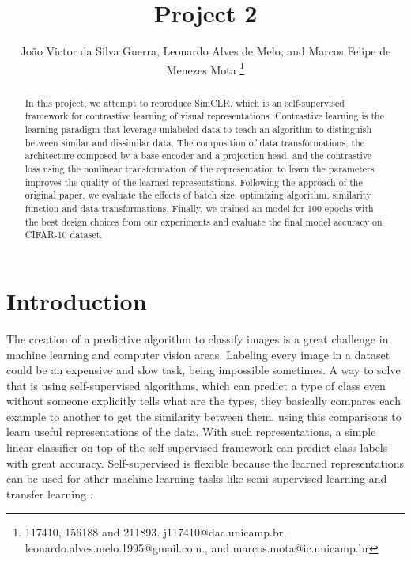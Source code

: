 \documentclass{article}
\begin{document}
\title{Project 2}
\author{
Jo\~ao Victor da Silva Guerra,
Leonardo Alves de Melo,
and Marcos Felipe de Menezes Mota
\thanks{117410, 156188 and 211893. j117410@dac.unicamp.br, leonardo.alves.melo.1995@gmail.com., and marcos.mota@ic.unicamp.br}
}

\maketitle

\begin{abstract}

  In this project, we attempt to reproduce SimCLR, which is an self-supervised framework for contrastive learning of visual representations. Contrastive learning is the learning paradigm that leverage unlabeled data to teach an algorithm to distinguish between similar and dissimilar data. The composition of data transformations, the architecture composed by a base encoder and a projection head, and the contrastive loss using the nonlinear transformation of the representation to learn the parameters improves the quality of the learned representations. Following the approach of the original paper, we evaluate the effects of batch size, optimizing algorithm, similarity function and data transformations. Finally, we trained an model for 100 epochs with the best design choices from our experiments and evaluate the final model accuracy on CIFAR-10 dataset.

\end{abstract}

\section{Introduction}

The creation of a predictive algorithm to classify images is a great challenge in machine learning and computer vision areas. Labeling every image in a dataset could be an expensive and slow task, being impossible sometimes. A way to solve that is using self-supervised algorithms, which can predict a type of class even without someone explicitly tells what are the types, they basically compares each example to another to get the similarity between them, using this comparisons to learn useful representations of the data. With such representations, a simple linear classifier on top of the self-supervised framework can predict class labels with great accuracy. Self-supervised is flexible because the learned representations can be used for other machine learning tasks like semi-supervised learning and transfer learning \cite{simclr}.  
\end{document}
